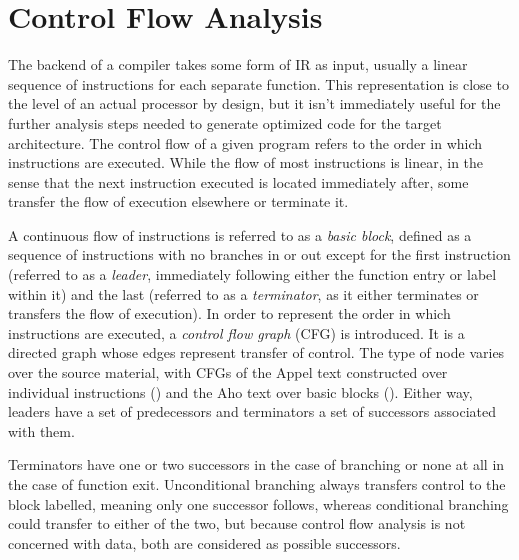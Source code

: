 \documentclass{article}
\begin{document}
\newpage

\section{Control Flow Analysis}



The backend of a compiler takes some form of IR as input, usually a linear sequence of instructions for each separate function. This representation is close to the level of an actual processor by design, but it isn't immediately useful for the further analysis steps needed to generate optimized code for the target architecture. %
The control flow of a given program refers to the order in which instructions are executed. While the flow of most instructions is linear, in the sense that the next instruction executed is located immediately after, some transfer the flow of execution elsewhere or terminate it. %


A continuous flow of instructions is referred to as a \textit{basic block}, defined as a sequence of instructions with no branches in or out except for the first instruction (referred to as a \textit{leader}, immediately following either the function entry or label within it) and the last (referred to as a \textit{terminator}, as it either terminates or transfers the flow of execution). %
In order to represent the order in which instructions are executed, a \textit{control flow graph} (CFG) is introduced. It is a directed graph whose edges represent transfer of control. The type of node varies over the source material, with CFGs of the Appel text constructed over individual instructions (\cite{tiger}) and the Aho text over basic blocks (\cite{dragon}).
Either way, leaders have a set of predecessors and terminators a set of successors associated with them.

Terminators have one or two successors in the case of branching or none at all in the case of function exit. %
Unconditional branching always transfers control to the block labelled, meaning only one successor follows, whereas conditional branching could transfer to either of the two, but because control flow analysis is not concerned with data, both are considered as possible successors. %
\end{document}
